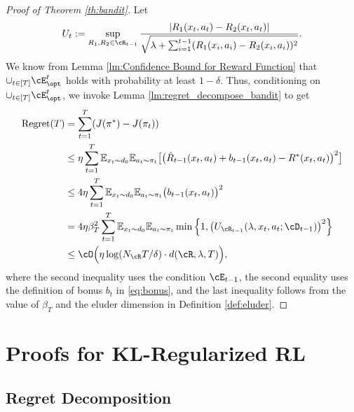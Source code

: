 \documentclass[11pt]{article}
\newcommand{\rE}{\mathbb E}
\begin{document}
\begin{proof}[Proof of Theorem \ref{th:bandit}]
Let
$$
U_t := \sup_{R_1,R_2\in\cR_{t-1}}\frac{|R_1(x
_t,a_t)-R_2(x_t,a_t)|}{\sqrt{\lambda+\sum_{i=1}^{t-1}(R_1(x_i,a_i)-R_2(x_i,a_i))^2}}.
$$
We know from Lemma \ref{lm:Confidence Bound for Reward Function} that $\cup_{t\in[T]}\cE_{\opt}^t$ holds with probability at least $1-\delta$. Thus, conditioning on $\cup_{t\in[T]}\cE_{\opt}^t$, we invoke Lemma \ref{lm:regret_decompose_bandit} to get
\begin{align*}
    \mathrm{Regret}(T) &= \sum_{t=1}^T(J(\pi^*)-J(\pi_t))\\
    &\le \eta\sum_{t=1}^T\rE_{x_t \sim d_0} \rE_{a_t\sim \pi_t} \bigl[\bigl(\hat R_{t - 1}(x_t, a_t) + b_{t - 1}(x_t, a_t) - R^*(x_t, a_t)\bigr)^2 \bigr]\\
    &\le 4\eta\sum_{t=1}^T\rE_{x_t \sim d_0} \rE_{a_t\sim \pi_t} \bigl(b_{t - 1}(x_t, a_t)\bigr)^2\\
    &= 4\eta\beta_T^2 \sum_{t=1}^T\rE_{x_t \sim d_0} \rE_{a_t\sim \pi_t} \min\Big\{1, \big(U_{\cR_{t-1}}(\lambda,x_t,a_t;\cD_{t-1})\big)^2\Big\}\\
    &\le \cO\Big(\eta\log(N_{\cR}T/\delta)\cdot d(\cR,\lambda,T)\Big),
\end{align*}
where the second inequality uses the condition $\cE_{t-1}$, the second equality uses the definition of bonus $b_t$ in \eqref{eq:bonus}, and the last inequality follows from the value of $\beta_T$ and the eluder dimension in Definition \ref{def:eluder}.
\end{proof}



\section{Proofs for KL-Regularized RL}\label{sec:proof_mdp}
\subsection{Regret Decomposition}\label{ssec:regret_decomp}
\end{document}
